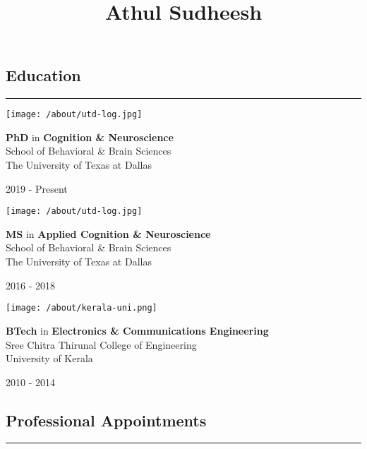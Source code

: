 \documentclass[
  letterpaper,
  DIV=11,
  numbers=noendperiod]{scrartcl}
\title{Athul Sudheesh}
\author{}
\date{}
\begin{document}
\maketitle

\ifdefined\Shaded\renewenvironment{Shaded}{\begin{tcolorbox}[boxrule=0pt, enhanced, borderline west={3pt}{0pt}{shadecolor}, interior hidden, sharp corners, frame hidden]}{\end{tcolorbox}}\fi

\hypertarget{hero-heading}{}
\hypertarget{education}{%
\subsection{Education}\label{education}}

\begin{center}\rule{0.5\linewidth}{0.5pt}\end{center}

\texttt{[image: /about/utd-log.jpg]}

\textbf{PhD} in \textbf{Cognition \& Neuroscience}\\
School of Behavioral \& Brain Sciences\\
The University of Texas at Dallas

2019 - Present

\texttt{[image: /about/utd-log.jpg]}

\textbf{MS} in \textbf{Applied Cognition \& Neuroscience}\\
School of Behavioral \& Brain Sciences\\
The University of Texas at Dallas

2016 - 2018

\texttt{[image: /about/kerala-uni.png]}

\textbf{BTech} in \textbf{Electronics \& Communications Engineering}\\
Sree Chitra Thirunal College of Engineering\\
University of Kerala

2010 - 2014

\hypertarget{professional-appointments}{%
\subsection{Professional Appointments}\label{professional-appointments}}

\begin{center}\rule{0.5\linewidth}{0.5pt}\end{center}
\end{document}
